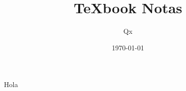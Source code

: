 \documentclass[theme=mocha, pagecolor, pagesize=a5paper, stretchmode]{qx-files/qx-notes}
\title{TeXbook Notas}
\author{Qx}
\date{\today}
\begin{document}
  \maketitle

  Hola
\end{document}
